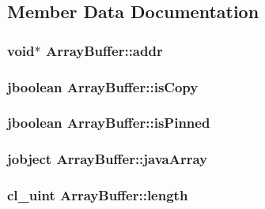 \subsection{Member Data Documentation}
\hypertarget{class_array_buffer_ab3676dd66e12d778c41a0e6cf551cf2f}{
\subsubsection[{addr}]{\setlength{\rightskip}{0pt plus 5cm}void$\ast$ Array\-Buffer\-::addr}}\label{class_array_buffer_ab3676dd66e12d778c41a0e6cf551cf2f}
\hypertarget{class_array_buffer_a4a1262a3549dfe5e0fe59eebe87d9325}{
\subsubsection[{is\-Copy}]{\setlength{\rightskip}{0pt plus 5cm}jboolean Array\-Buffer\-::is\-Copy}}\label{class_array_buffer_a4a1262a3549dfe5e0fe59eebe87d9325}
\hypertarget{class_array_buffer_a9c367c924157552a61d07c919e2f8c44}{
\subsubsection[{is\-Pinned}]{\setlength{\rightskip}{0pt plus 5cm}jboolean Array\-Buffer\-::is\-Pinned}}\label{class_array_buffer_a9c367c924157552a61d07c919e2f8c44}
\hypertarget{class_array_buffer_aff59baf34e6b6ee7cdf881425d71e407}{
\subsubsection[{java\-Array}]{\setlength{\rightskip}{0pt plus 5cm}jobject Array\-Buffer\-::java\-Array}}\label{class_array_buffer_aff59baf34e6b6ee7cdf881425d71e407}
\hypertarget{class_array_buffer_adfbebf14a3938a28732161382f654f20}{
\subsubsection[{length}]{\setlength{\rightskip}{0pt plus 5cm}cl\-\_\-uint Array\-Buffer\-::length}}\label{class_array_buffer_adfbebf14a3938a28732161382f654f20}
